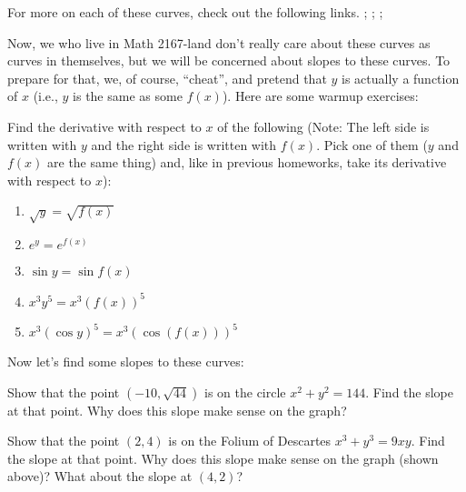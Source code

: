 \documentclass[handout]{ximera}
\begin{document}
For more on each of these curves, check out the following links. ; ; ; 

Now, we who live in Math 2167-land don't really care about these curves as curves in themselves, but we will be concerned about slopes to these curves.  To prepare for that, we, of course, ``cheat'', and pretend that $y$ is actually a function of $x$ (i.e., $y$ is the same as some $f(x)$).  Here are some warmup exercises:

\begin{exercise} 
Find the derivative with respect to $x$ of the following (Note: The left side is written with $y$ and the right side is written with $f(x)$.  Pick one of them ($y$ and $f(x)$ are the same thing) and, like in previous homeworks, take its derivative with respect to $x$):
\begin{enumerate}
    \item $\sqrt{y} = \sqrt{f(x)}$
    \item $e^y = e^{f(x)}$
    \item $\sin y = \sin f(x)$
    \item $x^3y^5 = x^3(f(x))^5$
    \item $x^3 (\cos y)^5 = x^3(\cos (f(x)))^5$
\end{enumerate}
\end{exercise}
        Now let’s find some slopes to these curves:
\begin{exercise} 
Show that the point $(-10,  \sqrt{44})$ is on the circle  $x^2 + y^2 = 144$.  Find the slope at that point.  Why does this slope make sense on the graph?
\end{exercise}
\begin{exercise} 
Show that the point $(2, 4)$ is on the Folium of Descartes  $x^3+y^3=9xy$.  Find the slope at that point.  Why does this slope make sense on the graph (shown above)?  What about the slope at $(4,2)$?
\end{exercise}
\end{document}
